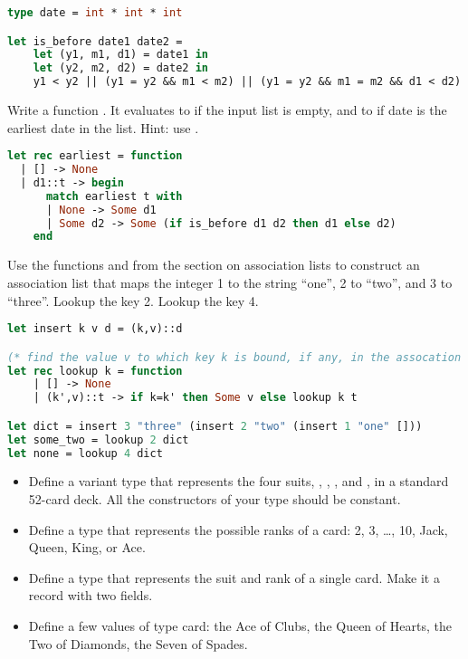 \begin{lstlisting}[language=OCaml]
type date = int * int * int

let is_before date1 date2 =
	let (y1, m1, d1) = date1 in
	let (y2, m2, d2) = date2 in
	y1 < y2 || (y1 = y2 && m1 < m2) || (y1 = y2 && m1 = m2 && d1 < d2)
\end{lstlisting}

Write a function . It evaluates to  if the input list is empty, and to  if date  is the earliest date in the list. Hint: use .

\begin{lstlisting}[language=OCaml]
let rec earliest = function
  | [] -> None
  | d1::t -> begin
      match earliest t with
      | None -> Some d1
      | Some d2 -> Some (if is_before d1 d2 then d1 else d2)
    end
\end{lstlisting}

Use the functions  and  from the section on association lists to construct an association list that maps the integer 1 to the string ``one'', 2 to ``two'', and 3 to ``three''. Lookup the key 2. Lookup the key 4.

\begin{lstlisting}[language=OCaml]
let insert k v d = (k,v)::d

(* find the value v to which key k is bound, if any, in the assocation list *)
let rec lookup k = function
	| [] -> None
	| (k',v)::t -> if k=k' then Some v else lookup k t

let dict = insert 3 "three" (insert 2 "two" (insert 1 "one" []))
let some_two = lookup 2 dict
let none = lookup 4 dict
\end{lstlisting}

\problem[cards]
\begin{itemize}
	\item Define a variant type  that represents the four suits, , , , and , in a standard 52-card deck. All the constructors of your type should be constant.
	\item Define a type  that represents the possible ranks of a card: 2, 3, \ldots, 10, Jack, Queen, King, or Ace.
	\item Define a type  that represents the suit and rank of a single card. Make it a record with two fields.
	\item Define a few values of type card: the Ace of Clubs, the Queen of Hearts, the Two of Diamonds, the Seven of Spades.
\end{itemize}

